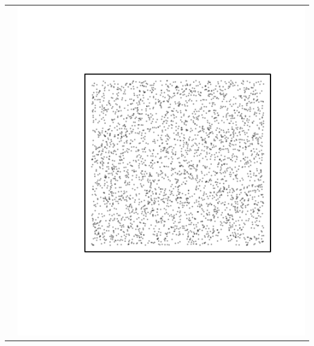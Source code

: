 \documentclass{article}\usepackage{graphicx, color}
\makeatletter
\def\maxwidth{ %
  \ifdim\Gin@nat@width>\linewidth
    \linewidth
  \else
    \Gin@nat@width
  \fi
}
\newenvironment{knitrout}{}{} %
\makeatother
\begin{document}
\begin{tabular}{cc}
&
\begin{knitrout}
\definecolor{shadecolor}{rgb}{0.969, 0.969, 0.969}\color{fgcolor}\includegraphics[width=\maxwidth]{figure/unnamed-chunk-16} 
\end{knitrout}

\\
\end{tabular}

\newpage
\end{document}

